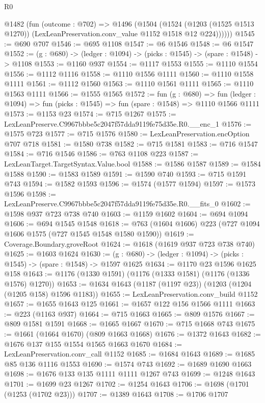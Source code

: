\begin{lexlean}{R0}
\begin{coremodule}
      @1482
        (fun (outcome : @702) =>
        @1496
          (@1504
            (@1524
              (@1203 (@1525 @1513 @1270))
              (LexLeanPreservation.conv_value @1152 @1518 @12 @224))))))
@1545 := @690 @707
@1546 := @695 @1108
@1547 := @6 @1546
@1548 := @6 @1547
@1552 := (g : @680) -> (ledger : @1094) -> (picks : @1545) -> (spare : @1548) -> @1108
@1553 := @1160 @937
@1554 := @1117 @1553
@1555 := @1110 @1554
@1556 := @1112 @1116
@1558 := @1110 @1556 @1111
@1560 := @1110 @1558 @1111
@1561 := @1112 @1560
@1563 := @1110 @1561 @1111
@1565 := @1110 @1563 @1111
@1566 := @1555 @1565
@1572 := fun (g : @680) =>
  fun (ledger : @1094) => fun (picks : @1545) => fun (spare : @1548) => @1110 @1566 @1111
@1573 := @1153 @23
@1574 := @715 @1267
@1575 := LexLeanPreserve.C9967bbbe5c2047f57dda9119fe75d35e.R0.__enc_1
@1576 := @1575 @723
@1577 := @715 @1576
@1580 := LexLeanPreservation.encOption @707 @718
@1581 := @1580 @738
@1582 := @715 @1581
@1583 := @716 @1547
@1584 := @716 @1546
@1586 := @763 @1108 @223
@1587 := LexLeanTarget.TargetSyntax.Value.bool
@1588 := @1586 @1587
@1589 := @1584 @1588
@1590 := @1583 @1589
@1591 := @1590 @740
@1593 := @715 @1591 @743
@1594 := @1582 @1593
@1596 := @1574 (@1577 @1594)
@1597 := @1573 @1596
@1598 := LexLeanPreserve.C9967bbbe5c2047f57dda9119fe75d35e.R0.__fits_0
@1602 := @1598 @937 @723 @738 @740
@1603 := @1159 @1602
@1604 := @694 @1094
@1606 := @694 @1545 @1548
@1618 := @763 (@1604 @1606) @223 (@727 @1094 @1606 @1575 (@727 @1545 @1548 @1580 @1590))
@1619 := Coverage.Boundary.groveRoot
@1624 := @1618 (@1619 @937 @723 @738 @740)
@1625 := @1603 @1624
@1630 := (g : @680) -> (ledger : @1094) -> (picks : @1545) -> (spare : @1548) -> @1597 @1625
@1634 := @1170 @23 @1596 @1625 @158
@1643 := @1176 (@1330 @1591) (@1176 (@1333 @1581) (@1176 (@1336 @1576) @1270))
@1653 := @1634 @1643 (@1187 (@1197 @23)) (@1203 (@1204 (@1205 @158) @1596 @1183))
@1655 := LexLeanPreservation.conv_build @1152
@1657 := @1655 @1643 @125
@1661 := @1657 @122 @156 @1566 @1111
@1663 := @223 (@1163 @937)
@1664 := @715 @1663
@1665 := @809 @1576
@1667 := @809 @1581 @1591
@1668 := @1665 @1667
@1670 := @715 @1668 @743
@1675 := @1661 (@1664 @1670) (@809 @1663 @1668)
@1676 := @1372 @1643
@1682 := @1676 @137 @155 @1554 @1565 @1663 @1670
@1684 := LexLeanPreservation.conv_call @1152
@1685 := @1684 @1643
@1689 := @1685 @85 @136 @1116 @1553
@1690 := @1574 @743
@1692 := @1689 @1690 @1663
@1698 := @1676 @133 @135 @1111 @1111 @1267 @743
@1699 := @1248 @1643
@1701 := @1699 @23 @1267
@1702 := @1254 @1643
@1706 := @1698 (@1701 (@1253 (@1702 @23)))
@1707 := @1389 @1643
@1708 := @1706 @1707

\end{coremodule}
\end{lexlean}
